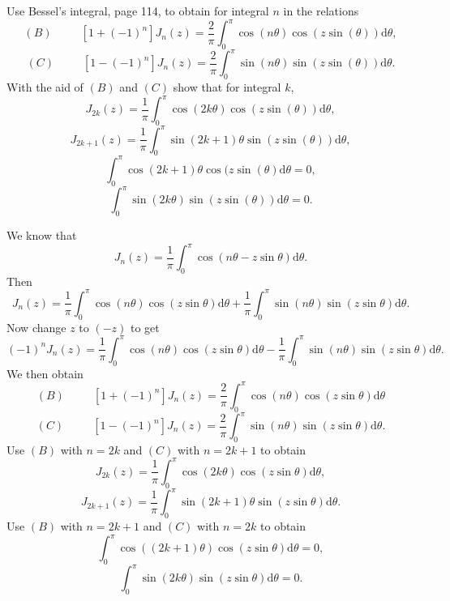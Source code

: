 \begin{problem}\label{problem4chapter6}
Use Bessel's integral, page 114, to obtain for integral $n$ in the relations
$$(B) \hspace{30pt} [1+(-1)^n]J_n(z) = \dfrac{2}{\pi} \displaystyle\int_0^{\pi} \cos(n \theta) \cos(z \sin (\theta)) \mathrm{d} \theta,$$
$$(C) \hspace{30pt} [1-(-1)^n]J_n(z) = \dfrac{2}{\pi} \displaystyle\int_0^{\pi} \sin(n \theta) \sin(z \sin (\theta)) \mathrm{d} \theta.$$
With the aid of $(B)$ and $(C)$ show that for integral $k$,
$$J_{2k}(z) = \dfrac{1}{\pi} \displaystyle\int_0^{\pi} \cos(2k \theta) \cos(z \sin (\theta)) \mathrm{d} \theta,$$
$$J_{2k+1}(z) = \dfrac{1}{\pi} \displaystyle\int_0^{\pi} \sin(2k+1) \theta \sin(z \sin (\theta)) \mathrm{d} \theta,$$
$$\displaystyle\int_0^{\pi} \cos(2k+1)\theta \cos(z \sin(\theta) \mathrm{d}\theta = 0,$$
$$\displaystyle\int_0^{\pi} \sin(2k \theta) \sin(z \sin(\theta)) \mathrm{d} \theta = 0.$$
\end{problem}
\begin{solution}
We know that
$$J_n(z) = \dfrac{1}{\pi} \displaystyle\int_0^{\pi} \cos(n \theta - z \sin \theta) \mathrm{d} \theta.$$
Then
$$J_n(z) = \dfrac{1}{\pi} \displaystyle\int_0^{\pi} \cos (n \theta) \cos (z \sin \theta) \mathrm{d} \theta + \dfrac{1}{\pi} \displaystyle\int_0^{\pi} \sin(n \theta) \sin(z \sin \theta) \mathrm{d} \theta.$$
Now change $z$ to $(-z)$ to get 
$$(-1)^n J_n(z) = \dfrac{1}{\pi} \displaystyle\int_0^{\pi} \cos(n \theta) \cos(z \sin \theta) \mathrm{d} \theta - \dfrac{1}{\pi} \displaystyle\int_0^{\pi} \sin(n \theta) \sin(z \sin \theta) \mathrm{d} \theta.$$
We then obtain
$$(B) \hspace{30pt} [1+(-1)^n]J_n(z) = \dfrac{2}{\pi} \displaystyle\int_0^{\pi} \cos(n \theta) \cos(z \sin \theta) \mathrm{d} \theta$$
$$(C) \hspace{30pt} [1 - (-1)^n] J_n(z) = \dfrac{2}{\pi} \displaystyle\int_0^{\pi} \sin(n \theta) \sin(z \sin \theta) \mathrm{d} \theta.$$
Use $(B)$ with $n=2k$ and $(C)$ with $n=2k+1$ to obtain
$$J_{2k}(z) = \dfrac{1}{\pi} \displaystyle\int_0^{\pi} \cos(2k \theta) \cos(z \sin \theta) \mathrm{d} \theta,$$
$$J_{2k+1}(z) = \dfrac{1}{\pi} \displaystyle\int_0^{\pi} \sin(2k+1)\theta \sin(z \sin \theta) \mathrm{d} \theta.$$
Use $(B)$ with $n= 2k+1$ and $(C)$ with $n=2k$ to obtain
$$\displaystyle\int_0^{\pi} \cos((2k+1)\theta) \cos(z \sin \theta) \mathrm{d} \theta = 0,$$
$$\displaystyle\int_0^{\pi} \sin(2k \theta) \sin(z \sin \theta) \mathrm{d} \theta = 0.$$
\end{solution}
